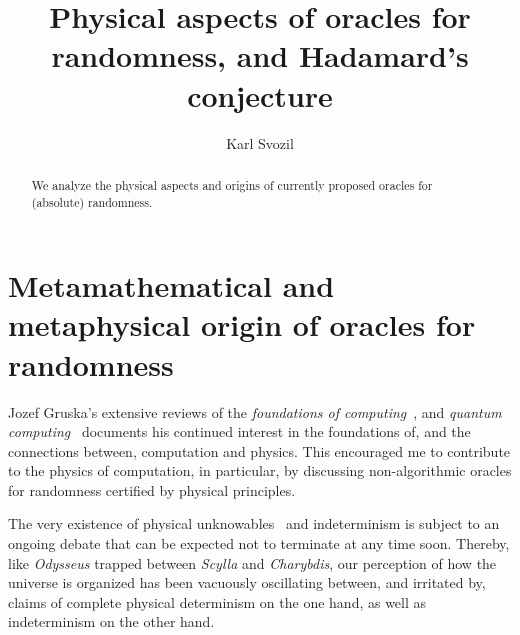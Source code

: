 \documentclass{llncs}
\begin{document}
%
\frontmatter          %
%
\pagestyle{headings}  %

\mainmatter




\title{Physical aspects of oracles for randomness, and Hadamard's conjecture}
%
%
\author{Karl Svozil}
%
%
%
\maketitle              %

\begin{abstract}
We analyze the physical aspects and origins of currently proposed oracles for (absolute) randomness.
\end{abstract}


\section{Metamathematical and metaphysical origin of oracles for randomness}

Jozef Gruska's extensive reviews of the {\em foundations of computing}~\cite{Gruska-foc},
and {\em quantum computing}~\cite{Gruska}
documents his continued interest in the foundations of, and the connections between,
computation and physics.
This encouraged me to contribute to the physics of computation, in particular, by discussing
non-algorithmic oracles for randomness certified by physical principles.

The very existence of physical unknowables~\cite{svozil-07-physical_unknowables}
and indeterminism is subject to an ongoing debate that can be expected not to terminate at any time soon.
Thereby, like {\it Odysseus} trapped between {\it Scylla} and {\it Charybdis},
our perception of how the universe is organized has been vacuously oscillating between, and irritated by, claims of
complete physical determinism on the one hand, as well as indeterminism on the other hand.
\end{document}
